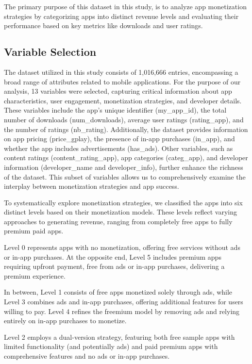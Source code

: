 \documentclass[
  12pt,
  a4paper,
]{article}
\begin{document}
The primary purpose of this dataset in this study, is to analyze app
monetization strategies by categorizing apps into distinct revenue
levels and evaluating their performance based on key metrics like
downloads and user ratings.

\subsection{Variable Selection}\label{variable-selection}

The dataset utilized in this study consists of 1,016,666 entries,
encompassing a broad range of attributes related to mobile applications.
For the purpose of our analysis, 13 variables were selected, capturing
critical information about app characteristics, user engagement,
monetization strategies, and developer details. These variables include
the app's unique identifier (my\_app\_id), the total number of downloads
(num\_downloads), average user ratings (rating\_app), and the number of
ratings (nb\_rating). Additionally, the dataset provides information on
app pricing (price\_gplay), the presence of in-app purchases (in\_app),
and whether the app includes advertisements (has\_ads). Other variables,
such as content ratings (content\_rating\_app), app categories
(categ\_app), and developer information (developer\_name and
developer\_info), further enhance the richness of the dataset. This
subset of variables allows us to comprehensively examine the interplay
between monetization strategies and app success.

To systematically explore monetization strategies, we classified the
apps into six distinct levels based on their monetization models. These
levels reflect varying approaches to generating revenue, ranging from
completely free apps to fully premium paid apps.

Level 0 represents apps with no monetization, offering free services
without ads or in-app purchases. At the opposite end, Level 5 includes
premium apps requiring upfront payment, free from ads or in-app
purchases, delivering a premium experience.

In between, Level 1 consists of free apps monetized solely through ads,
while Level 3 combines ads and in-app purchases, offering additional
features for users willing to pay. Level 4 refines the freemium model by
removing ads and relying entirely on in-app purchases to monetize.

Level 2 employs a dual-version strategy, featuring both free sample apps
with limited functionality (and potentially ads) and paid premium apps
with comprehensive features and no ads or in-app purchases.
\end{document}
